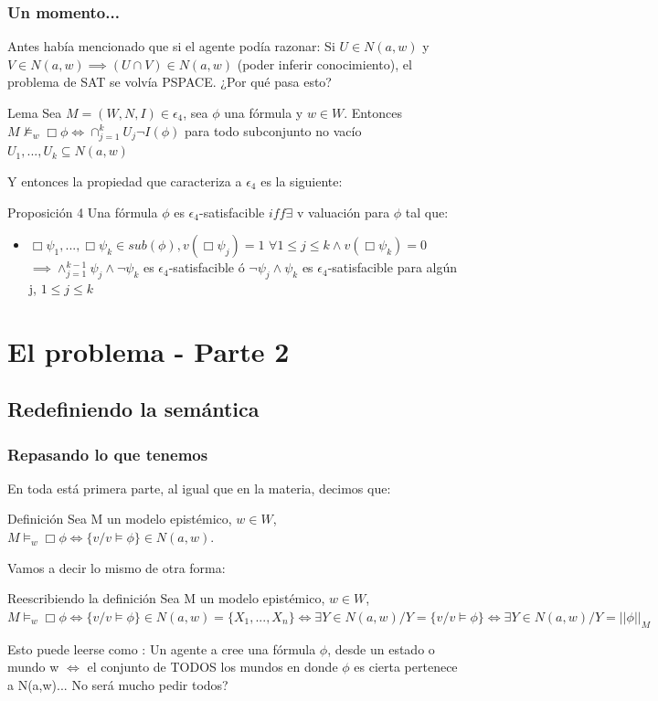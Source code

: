\documentclass{beamer}
\begin{document}
\begin{frame}
\frametitle{Un momento...}

Antes hab\'ia mencionado que si el agente pod\'ia razonar:
Si $U \in N(a,w)$ y $V \in N(a,w) \implies (U \cap V) \in N(a,w)$ (poder inferir conocimiento), el problema de SAT se volv\'ia PSPACE.
¿Por qu\'e pasa esto?

\begin{block}{Lema}
Sea $M = (W,N,I) \in \epsilon_{4}$, sea $\phi$ una f\'ormula y $w \in W$. Entonces $M \nvDash_{w}\Box\phi \iff \cap_{j = 1}^{k} U_{j} \neg I(\phi)$ para todo subconjunto no vac\'io ${U_{1},...,U_{k}} \subseteq N(a,w)$  
\end{block}

Y entonces la propiedad que caracteriza a $\epsilon_{4}$ es la siguiente:

\begin{block}{Proposici\'on 4}
Una f\'ormula $\phi$ es $\epsilon_{4}$-satisfacible $iff \exists$ v valuaci\'on para $\phi$ tal que: 
\begin{itemize}
\item $\Box\psi_{1}, ..., \Box\psi_{k} \in sub(\phi), v(\Box \psi_{j}) = 1$ $\forall 1 \leq j \le k \land v(\Box\psi_{k}) = 0$ $\implies \land_{j = 1}^{k-1} \psi_{j} \land \neg\psi_{k}$ es $\epsilon_{4}$-satisfacible \'o $\neg\psi_{j}\land\psi_{k}$ es $\epsilon_{4}$-satisfacible para alg\'un j, $1 \leq j \le k$
\end{itemize}
\end{block}
\end{frame}

\section{El problema - Parte 2}

\subsection{Redefiniendo la sem\'antica}
\begin{frame}
\frametitle{Repasando lo que tenemos}

En toda est\'a primera parte, al igual que en la materia, decimos que:

\begin{block}{Definici\'on}
 Sea M un modelo epist\'emico, $w \in W$, $M\models_{w} \Box\phi \iff \{v / v\models \phi\} \in N(a,w)$. 
\end{block}
Vamos a decir lo mismo de otra forma:

\begin{block}{Reescribiendo la definici\'on}
 Sea M un modelo epist\'emico, $w \in W$, $M\models_{w} \Box\phi \iff \{v / v\models \phi\} \in N(a,w)=\{X_{1}, ...,X_{n}\} \iff \exists Y \in N(a,w) / Y = \{v / v\models \phi\} \iff \exists Y \in N(a,w) / Y = ||\phi||_{M}$
\end{block}

Esto puede leerse como : Un agente a cree una f\'ormula $\phi$, desde un estado o mundo w $\iff$ el conjunto de TODOS los mundos en donde $\phi$ es cierta pertenece a N(a,w)... No ser\'a mucho pedir todos?

\end{frame}
\end{document}
